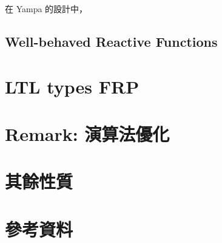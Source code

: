 \documentclass{article}
\begin{document}
  在 Yampa 的設計中，

  \subsection{Well-behaved Reactive Functions}
\section{LTL types FRP}


\section{Remark: 演算法優化}
\section{其餘性質}
\section{參考資料}
\end{document}

